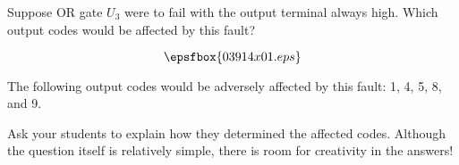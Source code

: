 

Suppose OR gate $U_3$ were to fail with the output terminal always high.  Which output codes would be affected by this fault?

$$\epsfbox{03914x01.eps}$$







The following output codes would be adversely affected by this fault: 1, 4, 5, 8, and 9.







Ask your students to explain how they determined the affected codes.  Although the question itself is relatively simple, there is room for creativity in the answers!




